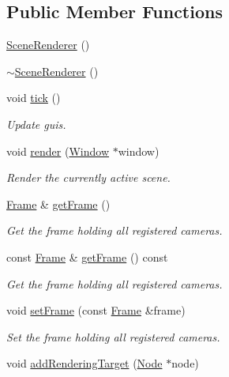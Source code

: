 \subsection*{Public Member Functions}
\begin{DoxyCompactItemize}
\item 
\mbox{\hyperlink{classec_1_1_scene_renderer_a7759ceff361e2d9b90ffe35ee61dc8c2}{Scene\+Renderer}} ()
\item 
\mbox{\hyperlink{classec_1_1_scene_renderer_ae8350e90e64b53e3dfb121c11a9d3283}{$\sim$\+Scene\+Renderer}} ()
\item 
void \mbox{\hyperlink{classec_1_1_scene_renderer_a62a39c6b1097757c9757c17506a8b2b0}{tick}} ()
\begin{DoxyCompactList}\small\item\em Update guis. \end{DoxyCompactList}\item 
void \mbox{\hyperlink{classec_1_1_scene_renderer_aa8cdd59972fd7dc7ce7c65e69c4a358b}{render}} (\mbox{\hyperlink{classec_1_1_window}{Window}} $\ast$window)
\begin{DoxyCompactList}\small\item\em Render the currently active scene. \end{DoxyCompactList}\item 
\mbox{\hyperlink{classec_1_1_frame}{Frame}} \& \mbox{\hyperlink{classec_1_1_scene_renderer_a5e314c4d0e216f80e38d72792b0f81b1}{get\+Frame}} ()
\begin{DoxyCompactList}\small\item\em Get the frame holding all registered cameras. \end{DoxyCompactList}\item 
const \mbox{\hyperlink{classec_1_1_frame}{Frame}} \& \mbox{\hyperlink{classec_1_1_scene_renderer_a8d40b598152f261d0fb3bcfa829e26e9}{get\+Frame}} () const
\begin{DoxyCompactList}\small\item\em Get the frame holding all registered cameras. \end{DoxyCompactList}\item 
void \mbox{\hyperlink{classec_1_1_scene_renderer_a3981f0af87cf5b190b4dd5b0aa694472}{set\+Frame}} (const \mbox{\hyperlink{classec_1_1_frame}{Frame}} \&frame)
\begin{DoxyCompactList}\small\item\em Set the frame holding all registered cameras. \end{DoxyCompactList}\item 
void \mbox{\hyperlink{classec_1_1_scene_renderer_a2d6d678c8e8cd9c068312a951cf8f33c}{add\+Rendering\+Target}} (\mbox{\hyperlink{classec_1_1_node}{Node}} $\ast$node)
\end{DoxyCompactItemize}
